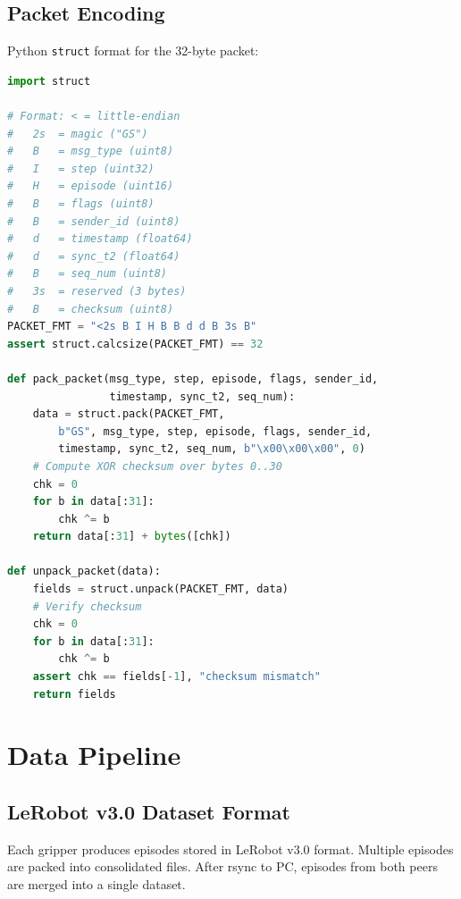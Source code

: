 \documentclass[11pt,a4paper]{article}
\begin{document}
\subsection{Packet Encoding}

Python \texttt{struct} format for the 32-byte packet:

\begin{lstlisting}[language=Python]
import struct

# Format: < = little-endian
#   2s  = magic ("GS")
#   B   = msg_type (uint8)
#   I   = step (uint32)
#   H   = episode (uint16)
#   B   = flags (uint8)
#   B   = sender_id (uint8)
#   d   = timestamp (float64)
#   d   = sync_t2 (float64)
#   B   = seq_num (uint8)
#   3s  = reserved (3 bytes)
#   B   = checksum (uint8)
PACKET_FMT = "<2s B I H B B d d B 3s B"
assert struct.calcsize(PACKET_FMT) == 32

def pack_packet(msg_type, step, episode, flags, sender_id,
                timestamp, sync_t2, seq_num):
    data = struct.pack(PACKET_FMT,
        b"GS", msg_type, step, episode, flags, sender_id,
        timestamp, sync_t2, seq_num, b"\x00\x00\x00", 0)
    # Compute XOR checksum over bytes 0..30
    chk = 0
    for b in data[:31]:
        chk ^= b
    return data[:31] + bytes([chk])

def unpack_packet(data):
    fields = struct.unpack(PACKET_FMT, data)
    # Verify checksum
    chk = 0
    for b in data[:31]:
        chk ^= b
    assert chk == fields[-1], "checksum mismatch"
    return fields
\end{lstlisting}


\section{Data Pipeline}

\subsection{LeRobot v3.0 Dataset Format}

Each gripper produces episodes stored in LeRobot v3.0 format. Multiple episodes are packed into consolidated files. After rsync to PC, episodes from both peers are merged into a single dataset.
\end{document}
